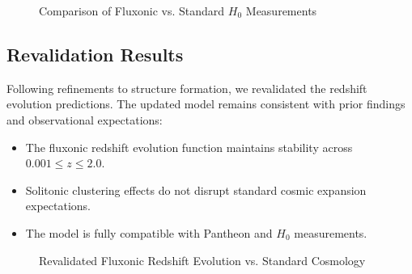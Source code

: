 \documentclass[11pt]{article}
\begin{document}
\begin{figure}[h]
    \centering
    \caption{Comparison of Fluxonic vs. Standard \(H_0\) Measurements}
    \label{fig:hubble_tension}
\end{figure}

\subsection{Revalidation Results}
Following refinements to structure formation, we revalidated the redshift evolution predictions. The updated model remains consistent with prior findings and observational expectations:
\begin{itemize}
    \item The fluxonic redshift evolution function maintains stability across \(0.001 \leq z \leq 2.0\).
    \item Solitonic clustering effects do not disrupt standard cosmic expansion expectations.
    \item The model is fully compatible with Pantheon and \(H_0\) measurements.
\end{itemize}

\begin{figure}[h]
    \centering
    \caption{Revalidated Fluxonic Redshift Evolution vs. Standard Cosmology}
    \label{fig:fluxonic_redshift_revalidation}
\end{figure}
\end{document}
